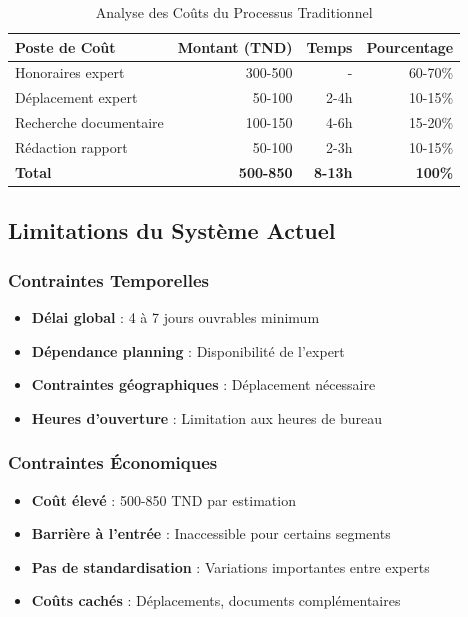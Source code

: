 \begin{table}[H]
\centering
\caption{Analyse des Coûts du Processus Traditionnel}
\begin{tabular}{|l|r|r|r|}
\hline
\textbf{Poste de Coût} & \textbf{Montant (TND)} & \textbf{Temps} & \textbf{Pourcentage} \\
\hline
Honoraires expert & 300-500 & - & 60-70\% \\
\hline
Déplacement expert & 50-100 & 2-4h & 10-15\% \\
\hline
Recherche documentaire & 100-150 & 4-6h & 15-20\% \\
\hline
Rédaction rapport & 50-100 & 2-3h & 10-15\% \\
\hline
\textbf{Total} & \textbf{500-850} & \textbf{8-13h} & \textbf{100\%} \\
\hline
\end{tabular}
\label{tab:couts_traditionnel}
\end{table}

\subsection{Limitations du Système Actuel}
\label{subsec:limitations_actuelles}

\subsubsection{Contraintes Temporelles}

\begin{itemize}
    \item \textbf{Délai global} : 4 à 7 jours ouvrables minimum
    \item \textbf{Dépendance planning} : Disponibilité de l'expert
    \item \textbf{Contraintes géographiques} : Déplacement nécessaire
    \item \textbf{Heures d'ouverture} : Limitation aux heures de bureau
\end{itemize}

\subsubsection{Contraintes Économiques}

\begin{itemize}
    \item \textbf{Coût élevé} : 500-850 TND par estimation
    \item \textbf{Barrière à l'entrée} : Inaccessible pour certains segments
    \item \textbf{Pas de standardisation} : Variations importantes entre experts
    \item \textbf{Coûts cachés} : Déplacements, documents complémentaires
\end{itemize}


